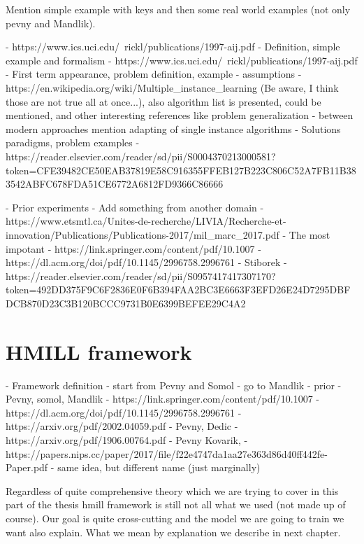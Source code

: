 

Mention simple example with keys and then some real world examples (not only pevny and Mandlik).


- https://www.ics.uci.edu/~rickl/publications/1997-aij.pdf
- Definition, simple example and formalism
    - https://www.ics.uci.edu/~rickl/publications/1997-aij.pdf - First term appearance, problem definition, example
    - assumptions - https://en.wikipedia.org/wiki/Multiple_instance_learning (Be aware, I think those are not true all at once...), also algorithm list is presented, could be mentioned, and other interesting references like problem generalization
        - between modern approaches mention adapting of single instance algorithms
    - Solutions paradigms, problem examples - https://reader.elsevier.com/reader/sd/pii/S0004370213000581?token=CFE39482CE50EAB37819E58C916355FFEB127B223C806C52A7FB11B383542ABFC678FDA51CE6772A6812FD9366C86666


- Prior experiments
    - Add something from another domain
    - https://www.etsmtl.ca/Unites-de-recherche/LIVIA/Recherche-et-innovation/Publications/Publications-2017/mil_marc_2017.pdf
    - The most impotant
        - https://link.springer.com/content/pdf/10.1007%
        - https://dl.acm.org/doi/pdf/10.1145/2996758.2996761
        - Stiborek - https://reader.elsevier.com/reader/sd/pii/S0957417417307170?token=492DD375F9C6F2836E0F6B394FAA2BC3E6663F3EFD26E24D7295DBFDCB870D23C3B120BCCC9731B0E6399BEFEE29C4A2


\section{HMILL framework}
- Framework definition
    - start from Pevny and Somol
    - go to Mandlik
- prior
    - Pevny, somol, Mandlik
        - https://link.springer.com/content/pdf/10.1007%
        - https://dl.acm.org/doi/pdf/10.1145/2996758.2996761
    - https://arxiv.org/pdf/2002.04059.pdf - Pevny, Dedic
    - https://arxiv.org/pdf/1906.00764.pdf - Pevny Kovarik, 
    - https://papers.nips.cc/paper/2017/file/f22e4747da1aa27e363d86d40ff442fe-Paper.pdf - same idea, but different name (just marginally)


Regardless of quite comprehensive theory which we are trying to cover in this part of the thesis hmill framework is still not all what we used (not made up of course). Our goal is quite cross-cutting and the model we are going to train we want also explain. What we mean by explanation we describe in next chapter.

